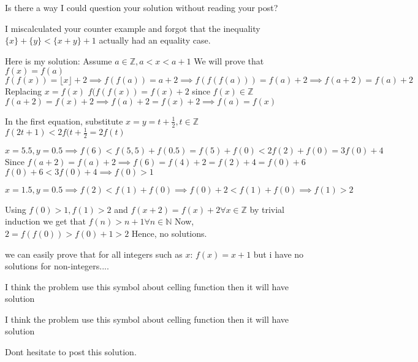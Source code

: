 \begin{solution}
	Is there a way I could question your solution without reading your post? 

I miscalculated your counter example and forgot that the inequality $\{x \} + \{y \} < \{x+y \} +1$ actually had an equality case.
\end{solution}



\begin{solution}
	Here is my solution:
Assume $a\in\mathbb{Z}, a<x<a+1$
We will prove that $f(x)=f(a)$
$f(f(x))=\lfloor x\rfloor +2 \implies f(f(a))=a+2 \implies f(f(f(a)))=f(a)+2 \implies f(a+2)=f(a)+2$
Replacing $x=f(x)$
$f(f(f(x))=f(x)+2$ since $f(x)\in\mathbb{Z}$
$f(a+2)=f(x)+2 \implies f(a)+2=f(x)+2 \implies f(a)=f(x)$

In the first equation, substitute $x=y=t+\frac{1}{2}, t\in\mathbb{Z}$
$f(2t+1)<2f(t+\frac{1}{2}=2f(t)$

$x=5.5, y=0.5 \implies f(6)<f(5,5)+f(0.5)=f(5)+f(0)<2f(2)+f(0)=3f(0)+4$
Since $f(a+2)=f(a)+2 \implies f(6)=f(4)+2=f(2)+4=f(0)+6$
$f(0)+6<3f(0)+4\implies f(0)>1$

$x=1.5, y=0.5 \implies f(2)<f(1)+f(0)\implies f(0)+2<f(1)+f(0) \implies f(1)>2$

Using $f(0)>1, f(1)>2$ and $f(x+2)=f(x)+2 \forall x\in\mathbb{Z}$ by trivial induction we get that $f(n)>n+1 \forall n\in\mathbb{N}$
Now, $2=f(f(0))>f(0)+1>2$
Hence, no solutions.
\end{solution}



\begin{solution}
	we can easily prove that for all integers such as $x$: $f(x)=x+1$ but i have no solutions for non-integers....
\end{solution}



\begin{solution}
	I think the problem use this symbol about celling function then it will have solution
\end{solution}



\begin{solution}
	\begin{tcolorbox}I think the problem use this symbol about celling function then it will have solution\end{tcolorbox}
Dont hesitate to post this solution.
\end{solution}



